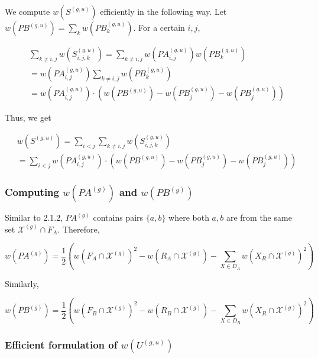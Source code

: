\documentclass{article}
\begin{document}
We compute $w\left(S^{(g, u)}\right)$ efficiently in the following way. Let $w\left(P B^{(g, u)}\right) = \sum_k w\left(P B_k^{(g, u)}\right)$. For a certain $i, j$,

\[
\begin{aligned}
& \sum_{k \neq i, j} w\left(S_{i, j, k}^{(g, u)}\right) = \sum_{k \neq i, j} w\left(P A_{i, j}^{(g, u)}\right) w\left(P B_k^{(g, u)}\right) \\
& = w\left(P A_{i, j}^{(g, u)}\right) \sum_{k \neq i, j} w\left(P B_k^{(g, u)}\right) \\
& = w\left(P A_{i, j}^{(g, u)}\right) \cdot \left( w\left(P B^{(g, u)}\right) - w\left(P B_j^{(g, u)}\right) - w\left(P B_j^{(g, u)}\right) \right)
\end{aligned}
\]

Thus, we get

\[
\begin{aligned}
& w\left(S^{(g, u)}\right) = \sum_{i<j} \sum_{k \neq i, j} w\left(S_{i, j, k}^{(g, u)}\right) \\
& = \sum_{i<j} w\left(P A_{i, j}^{(g, u)}\right) \cdot \left( w\left(P B^{(g, u)}\right) - w\left(P B_j^{(g, u)}\right) - w\left(P B_j^{(g, u)}\right) \right)
\end{aligned}
\]

\subsubsection{Computing $w\left(P A^{(g)}\right)$ and $w\left(P B^{(g)}\right)$}

Similar to 2.1.2, $P A^{(g)}$ contains pairs $\{a, b\}$ where both $a, b$ are from the same set $\mathcal{X}^{(g)} \cap F_A$. Therefore,

\[
w\left(P A^{(g)}\right) = \frac{1}{2} \left( w\left(F_A \cap \mathcal{X}^{(g)}\right)^2 - w\left(R_A \cap \mathcal{X}^{(g)}\right) - \sum_{X \in D_A} w\left(X_R \cap \mathcal{X}^{(g)}\right)^2 \right)
\]

Similarly,

\[
w\left(P B^{(g)}\right) = \frac{1}{2} \left( w\left(F_B \cap \mathcal{X}^{(g)}\right)^2 - w\left(R_B \cap \mathcal{X}^{(g)}\right) - \sum_{X \in D_B} w\left(X_R \cap \mathcal{X}^{(g)}\right)^2 \right)
\]

\subsubsection{Efficient formulation of $w\left(U^{(g, u)}\right)$}
\end{document}
